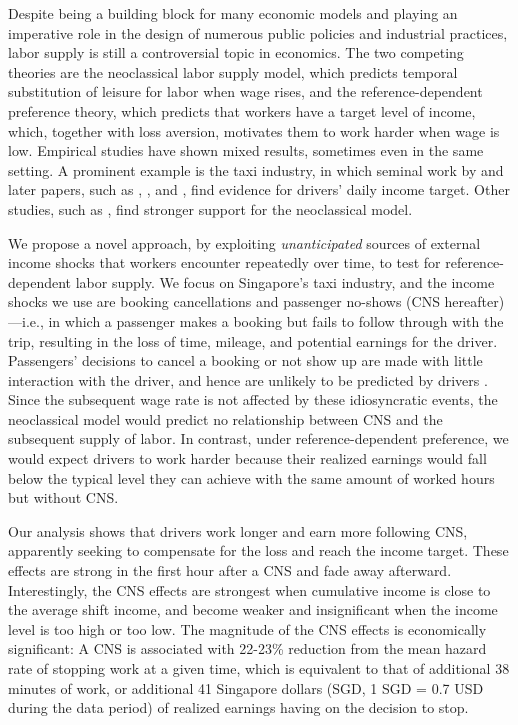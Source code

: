 \documentclass[reviewmode,AEJ]{AEA}
\begin{document}
\label{sec:intro}
Despite being a building block for many economic models and playing an imperative role in the 
design of numerous public policies and industrial practices, labor supply is still a controversial 
topic in economics. The two competing theories are the neoclassical labor supply model, which 
predicts temporal substitution of leisure for labor when wage rises, and the reference-dependent preference theory, 
which predicts that workers have a target level of income, which, together with loss aversion, 
motivates them to work harder when wage is low. Empirical studies have shown mixed results, 
sometimes even in the same setting.
A prominent example is the taxi industry, in which seminal work by \citet{camerer1997labor} and 
later papers, such as \citet{crawford2011new}, \citet{martin2017quit}, and \citet{thakral2018daily}, 
find evidence for drivers' daily income target. Other studies, such as 
\citet{farber2005tomorrow,farber2015you}, find stronger support for the neoclassical model.


We propose a novel approach, by exploiting \textit{unanticipated} sources of external 
income shocks that workers encounter repeatedly over time, to test for reference-dependent labor supply.
We focus on Singapore's taxi industry, and the income shocks we use are 
booking cancellations and passenger no-shows (CNS hereafter)---i.e., in which a passenger makes a booking but fails 
to follow through with the trip, resulting in the loss of time, mileage, and potential earnings
for the driver. Passengers' decisions to cancel a booking or not show up are made with 
little interaction with the driver, and hence are unlikely to be predicted by drivers%
. Since the subsequent wage rate is not affected 
by these idiosyncratic events, the neoclassical model would predict no relationship between CNS and the subsequent supply of labor. In contrast, under reference-dependent 
preference, we would expect drivers to work harder because their realized earnings would fall 
below the typical level they can achieve with the same amount of worked hours but without CNS. 

Our analysis shows that drivers work longer and earn more following 
CNS, apparently seeking to compensate for the loss and reach the income target. 
These effects are strong in the first hour after a 
CNS and fade away afterward. Interestingly, the CNS effects are strongest when cumulative income 
is close to the average shift income, and become weaker and insignificant when the income 
level is too high or too low. 
The magnitude of the CNS effects is economically significant: A CNS
is associated with 22-23\% reduction from the mean hazard rate of stopping work at a given time, %
which is equivalent to that of additional 38 minutes of work, or additional 41 Singapore dollars 
(SGD, 1 SGD = 0.7 USD during the data period) of realized earnings having on the decision to stop.
\end{document}
